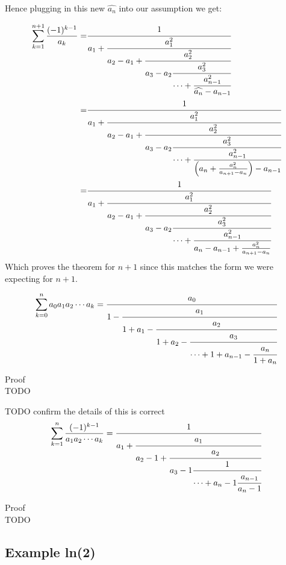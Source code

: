 \documentclass[a4paper]{article}
\begin{document}
\begin{theorem}
        Hence plugging in this new $\widehat{a_n}$ into our assumption we get:

        \begin{align*}
            \sum_{k=1}^{n+1} \frac{(-1)^{k-1}}{a_k} =& \cfrac{1}{a_1+\cfrac{a_{1}^{2}}{a_2 - a_1 +\cfrac{a_2^2}{a_3 - a_2
            \cfrac{a_3^2}{\cdots + \cfrac{a_{n-1}^2}{\widehat{a_n} - a_{n-1}}}}}}
            \\
            =& \cfrac{1}{a_1+\cfrac{a_{1}^{2}}{a_2 - a_1 +\cfrac{a_2^2}{a_3 - a_2
            \cfrac{a_3^2}{\cdots + \cfrac{a_{n-1}^2}{\Big( a_{n} + \frac{a_n^2}{a_{n+1} - a_{n}} \Big) - a_{n-1}}}}}}
            \\
            =& \cfrac{1}{a_1+\cfrac{a_{1}^{2}}{a_2 - a_1 +\cfrac{a_2^2}{a_3 - a_2
            \cfrac{a_3^2}{\cdots + \cfrac{a_{n-1}^2}{a_{n} - a_{n-1} + \frac{a_n^2}{a_{n+1} - a_{n}} }}}}}
        \end{align*}
        Which proves the theorem for $n+1$ since this matches the form we were expecting for $n+1$.

    \end{theorem}

    \begin{theorem}
        \label{euler_continued_fraction_formula}
        \[
        \sum_{k=0}^{n}  a_0 a_1 a_2 \cdots a_k = \cfrac{a_0}{1 - \cfrac{a_{1}}{1 + a_1 - \cfrac{a_2}{1 + a_2 -
        \cfrac{a_3}{\cdots +  1 + a_{n-1} - \cfrac{a_{n}}{1 + a_n}}}}}
        \]

        Proof\\
        TODO
    \end{theorem}

    \begin{theorem}
        \label{relation_to_power_series}
        TODO confirm the details of this is correct
        \[
        \sum_{k=1}^{n} \frac{(-1)^{k-1}}{a_1 a_2 \cdots a_k} = \cfrac{1}{a_1 + \cfrac{a_{1}}{a_2 - 1 +\cfrac{a_2}{a_3 - 1
        \cfrac{1}{\cdots +  a_n - 1 \cfrac{a_{n-1}}{a_n - 1}}}}}
        \]

        Proof\\
        TODO
    \end{theorem}

    \subsection{Example ln(2)}\label{subsec:example-ln(2)}
\end{document}
